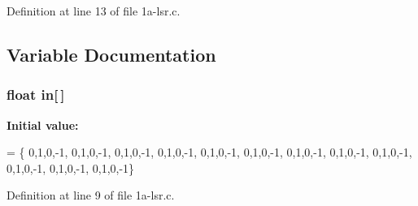 Definition at line 13 of file 1a-\/lsr.\+c.



\subsection{Variable Documentation}
\subsubsection[{\texorpdfstring{in}{in}}]{\setlength{\rightskip}{0pt plus 5cm}float in\mbox{[}$\,$\mbox{]}}\hypertarget{1a-lsr_8c_a5e1f81c05560c7a71e363eae3e260d72}{}\label{1a-lsr_8c_a5e1f81c05560c7a71e363eae3e260d72}
{\bfseries Initial value\+:}
\begin{DoxyCode}
= \{  
  0,1,0,-1, 0,1,0,-1, 0,1,0,-1, 0,1,0,-1, 0,1,0,-1, 0,1,0,-1,
  0,1,0,-1, 0,1,0,-1, 0,1,0,-1, 0,1,0,-1, 0,1,0,-1, 0,1,0,-1\}
\end{DoxyCode}


Definition at line 9 of file 1a-\/lsr.\+c.

